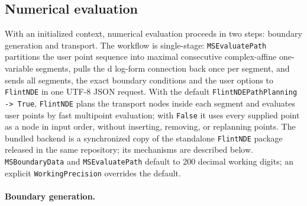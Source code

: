 \documentclass[11pt,a4paper]{article}
\numberwithin{table}{section}
\begin{document}
\subsection{Numerical evaluation}
\label{sec:numerics}

With an initialized context, numerical evaluation proceeds in two steps: boundary generation and
transport. The workflow is single-stage: \texttt{MSEvaluatePath} partitions the user point
sequence into maximal consecutive complex-affine one-variable segments, pulls the d log-form
connection back once per segment, and sends all segments, the exact boundary conditions and the
user options to \texttt{FlintNDE} in one UTF-8 JSON request. With the default
\texttt{FlintNDEPathPlanning -> True}, \texttt{FlintNDE} plans the transport nodes inside each segment and
evaluates user points by fast multipoint evaluation; with \texttt{False} it uses every supplied
point as a node in input order, without inserting, removing, or replanning points. The bundled
backend is a synchronized copy of the standalone \texttt{FlintNDE} package released in the same
repository; its mechanisms are described below. \texttt{MSBoundaryData} and \texttt{MSEvaluatePath}
default to 200 decimal working digits; an explicit \texttt{WorkingPrecision} overrides the
default.

\paragraph{Boundary generation.}
\end{document}
